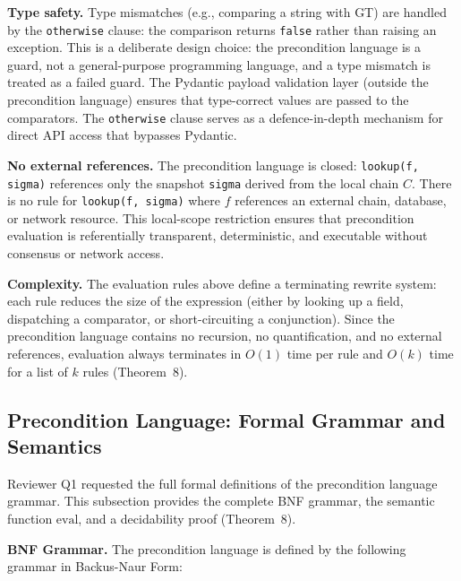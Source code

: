 \textbf{Type safety.} Type mismatches (e.g., comparing a string with GT) are handled by the \texttt{otherwise} clause: the comparison returns \texttt{false} rather than raising an exception. This is a deliberate design choice: the precondition language is a guard, not a general-purpose programming language, and a type mismatch is treated as a failed guard. The Pydantic payload validation layer (outside the precondition language) ensures that type-correct values are passed to the comparators. The \texttt{otherwise} clause serves as a defence-in-depth mechanism for direct API access that bypasses Pydantic.

\textbf{No external references.} The precondition language is closed: \texttt{lookup(f, sigma)} references only the snapshot \texttt{sigma} derived from the local chain $C$. There is no rule for \texttt{lookup(f, sigma)} where $f$ references an external chain, database, or network resource. This local-scope restriction ensures that precondition evaluation is referentially transparent, deterministic, and executable without consensus or network access.

\textbf{Complexity.} The evaluation rules above define a terminating rewrite system: each rule reduces the size of the expression (either by looking up a field, dispatching a comparator, or short-circuiting a conjunction). Since the precondition language contains no recursion, no quantification, and no external references, evaluation always terminates in $O(1)$ time per rule and $O(k)$ time for a list of $k$ rules (Theorem~8).

\subsection{Precondition Language: Formal Grammar and Semantics}
\label{subsec:precondition-formal-grammar}

Reviewer Q1 requested the full formal definitions of the precondition language grammar. This subsection provides the complete BNF grammar, the semantic function $\text{eval}$, and a decidability proof (Theorem~8).

\textbf{BNF Grammar.} The precondition language is defined by the following grammar in Backus-Naur Form:

